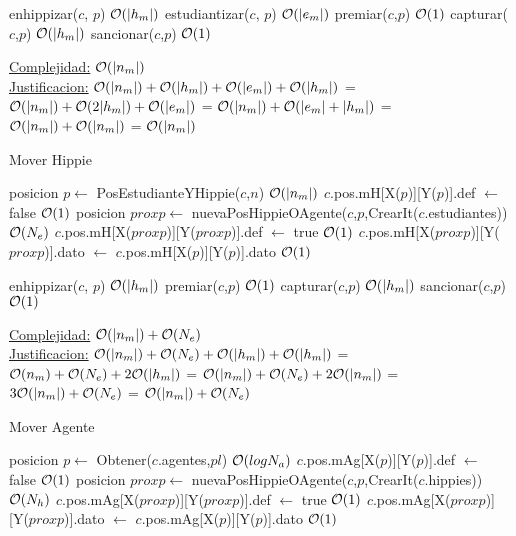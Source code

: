 \begin{Algoritmos}
\begin{algorithm}[H]
\begin{algorithmic}[1]
		\State enhippizar($c$, $p$) \Comment $\mathcal{O}(|h_m|)$
		\State estudiantizar($c$, $p$) \Comment $\mathcal{O}(|e_m|)$
		\State premiar($c$,$p$) \Comment $\mathcal{O}(1)$
		\State capturar($c$,$p$) \Comment $\mathcal{O}(|h_m|)$
		\State sancionar($c$,$p$) \Comment $\mathcal{O}(1)$
	\EndIf
\EndProcedure
\end{algorithmic}
\underline{Complejidad:} $\mathcal{O}(|n_m|)$\\
\underline{Justificacion:} $\mathcal{O}(|n_m|) + \mathcal{O}(|h_m|) + \mathcal{O}(|e_m|) + \mathcal{O}(|h_m|)$ = $\mathcal{O}(|n_m|) + \mathcal{O}(2|h_m|) + \mathcal{O}(|e_m|)$ = $\mathcal{O}(|n_m|) + \mathcal{O}(|e_m| + |h_m|)$ = $\mathcal{O}(|n_m|) + \mathcal{O}(|n_m|)$ = $\mathcal{O}(|n_m|)$
\end{algorithm}


\begin{algorithm}[H]
\caption{Mover Hippie}
\begin{algorithmic}[1]
	\State posicion $p \gets$ PosEstudianteYHippie($c$,$n$) \Comment $\mathcal{O}(|n_m|)$
	\State $c$.pos.mH[X($p$)][Y($p$)].def $\gets$ false \Comment $\mathcal{O}(1)$
	\State posicion $proxp \gets$ nuevaPosHippieOAgente($c$,$p$,CrearIt($c$.estudiantes)) \Comment $\mathcal{O}(N_e)$
	\State $c$.pos.mH[X($proxp$)][Y($proxp$)].def $\gets$ true \Comment $\mathcal{O}(1)$
	\State $c$.pos.mH[X($proxp$)][Y($proxp$)].dato $\gets$ $c$.pos.mH[X($p$)][Y($p$)].dato \Comment $\mathcal{O}(1)$
	
	\State enhippizar($c$, $p$) \Comment $\mathcal{O}(|h_m|)$
	\State premiar($c$,$p$) \Comment $\mathcal{O}(1)$
	\State capturar($c$,$p$) \Comment $\mathcal{O}(|h_m|)$
	\State sancionar($c$,$p$) \Comment $\mathcal{O}(1)$
\EndProcedure
\end{algorithmic}
\underline{Complejidad:} $\mathcal{O}(|n_m|) + \mathcal{O}(N_e)$\\
\underline{Justificacion:} $\mathcal{O}(|n_m|) + \mathcal{O}(N_e) + \mathcal{O}(|h_m|) + \mathcal{O}(|h_m|)$ = $\mathcal{O}(n_m) + \mathcal{O}(N_e) +2\mathcal{O}(|h_m|)$ = $\mathcal{O}(|n_m|) + \mathcal{O}(N_e) + 2\mathcal{O}(|n_m|)$ = $3\mathcal{O}(|n_m|) + \mathcal{O}(N_e)$ = $\mathcal{O}(|n_m|) + \mathcal{O}(N_e)$
\end{algorithm}


\begin{algorithm}[H]
\caption{Mover Agente}
\begin{algorithmic}[1]
	\State posicion $p \gets$ Obtener($c$.agentes,$pl$) \Comment $\mathcal{O}(log N_a)$
	\State $c$.pos.mAg[X($p$)][Y($p$)].def $\gets$ false \Comment $\mathcal{O}(1)$
	\State posicion $proxp \gets$ nuevaPosHippieOAgente($c$,$p$,CrearIt($c$.hippies)) \Comment $\mathcal{O}(N_h)$
	\State $c$.pos.mAg[X($proxp$)][Y($proxp$)].def $\gets$ true \Comment $\mathcal{O}(1)$
	\State $c$.pos.mAg[X($proxp$)][Y($proxp$)].dato $\gets$ $c$.pos.mAg[X($p$)][Y($p$)].dato \Comment $\mathcal{O}(1)$
	

\end{algorithmic}
\end{algorithm}
\end{Algoritmos}
